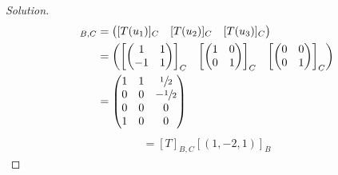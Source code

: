 \documentclass[fleqn, a4paper, 12pt]{article}
\theoremstyle{definition}
\theoremstyle{theorem}
\newenvironment{solution}
{\begin{proof}[Solution]\let\qed\relax}
	{\end{proof}}
\begin{document}
\begin{solution}
	\begin{align*}
		[T]_{B,C} &= 
			\begin{pmatrix}
				[T(u_1)]_C & [T(u_2)]_C & [T(u_3)]_C\\
			\end{pmatrix}\\
		&= 
		\begin{pmatrix}
			\left[
				\begin{pmatrix}
					1 & 1\\
					-1 & 1\\
				\end{pmatrix}
			\right]_C 
			& 
			\left[
				\begin{pmatrix}
					1 & 0\\
					0 & 1\\
				\end{pmatrix}
			\right]_C 
			&
			\left[
				\begin{pmatrix}
					0 & 0\\
					0 & 1\\
				\end{pmatrix}
			\right]_C 
		\end{pmatrix}\\
		&= 
			\begin{pmatrix}
				1 & 1 & \sfrac{1}{2}\\
				0 & 0 & -\sfrac{1}{2}\\
				0 & 0 & 0\\
				1 & 0 & 0\\
			\end{pmatrix}
	\end{align*}
	\begin{align*}
		[T(1, -2, 1)] = [T]_{B, C} [(1, -2, 1)]_{B}
	\end{align*}
\end{solution}
\end{document}
